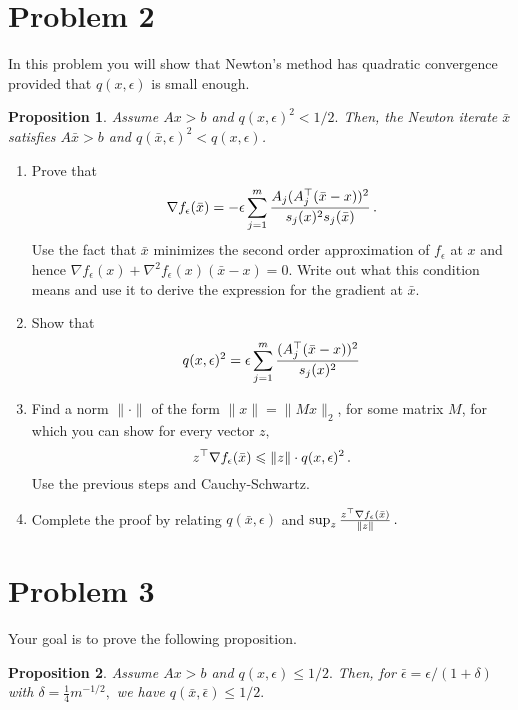 \documentclass[12pt]{article}
\newtheorem{prop}{Proposition}
\begin{document}
\section*{Problem 2}

In this problem you will show that Newton's method has quadratic convergence
provided that $q(x,\epsilon)$ is small enough.

\begin{prop}
\label{prop:two}
Assume $Ax>b$ and $q(x, \epsilon)^2 < 1/2.$ Then, the Newton iterate $\bar x$
satisfies $A\bar x > b$ and $q(\bar x, \epsilon)^2< q(x,\epsilon)$.
\end{prop}

\begin{enumerate}
\item
Prove that
\[
\nabla f_\epsilon(\bar x)
=
-\epsilon \sum_{j=1}^m \frac{A_j(A_j^\top(\bar x - x))^2}{s_j(x)^2s_j(\bar x)}\,.
\]
Use the fact that $\bar x$ minimizes the second order approximation of
$f_\epsilon$ at $x$ and hence $\nabla f_\epsilon(x)+ \nabla^2f_\epsilon(x)(\bar
x-x)=0.$ Write out what this condition means and use it to derive the expression
for the gradient at $\bar x.$

\item
Show that
\[
q(x, \epsilon)^2
= \epsilon\sum_{j=1}^m \frac{(A_j^\top(\bar x-x))^2}{s_j(x)^2}
\]

\item
Find a norm $\|\cdot\|$ of the form $\| x\| = \|M x\|_2$, for some matrix $M$, for which you can show for every vector $z,$
\[
z^\top \nabla f_\epsilon(\bar x) 
\leqslant \|z\|\cdot q(x,\epsilon)^2\,.
\]
Use the previous steps and Cauchy-Schwartz. 

\item
Complete the proof by relating $q(\bar x, \epsilon)$
and $\sup_z 
\frac{z^\top \nabla f_\epsilon(\bar x)}{\|z\|}\,.$
\end{enumerate}


\section*{Problem 3}

Your goal is to prove the following proposition.

\begin{prop}
Assume $Ax>b$ and $q(x, \epsilon)\le1/2.$ Then, for
$\bar\epsilon=\epsilon/(1+\delta)$ with $\delta=\frac14m^{-1/2},$ we have 
$q(\bar x, \bar\epsilon)\le 1/2.$
\end{prop}
\end{document}
